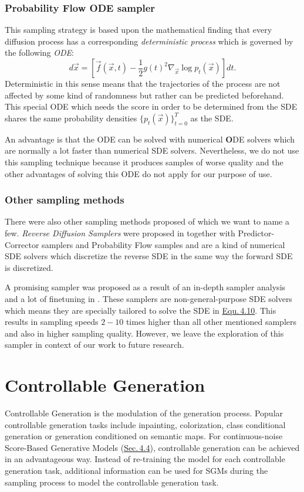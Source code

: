 \subsubsection{Probability Flow ODE sampler}
%
This sampling strategy is based upon the mathematical finding that every diffusion process has a corresponding \textit{deterministic process} which is governed by the following \textit{ODE}:
%
\begin{equation} \label{equ:4.21}
    d\vec{x}=\left[\vec{f}(\vec{x},t)-\frac{1}{2}g(t)^2\nabla_{\vec{x}}\log p_t(\vec{x})\right]dt.
\end{equation}
%
Deterministic in this sense means that the trajectories of the process are not affected by some kind of randomness but rather can be predicted beforehand. This special ODE which needs the score in order to be determined from the SDE shares the same probability densities $\{p_t(\vec{x})\}_{t=0}^T$ as the SDE. 

An advantage is that the ODE can be solved with numerical \textbf{O}DE solvers which are normally a lot faster than numerical SDE solvers. Nevertheless, we do not use this sampling technique because it produces samples of worse quality \cite{score_3} and the other advantages of solving this ODE do not apply for our purpose of use.
%
\subsubsection{Other sampling methods}
%
There were also other sampling methods proposed of which we want to name a few. \textit{Reverse Diffusion Samplers} were proposed in \cite{score_3} together with Predictor-Corrector samplers and Probability Flow samples and are a kind of numerical SDE solvers which discretize the reverse SDE in the same way the forward SDE is discretized.

A promising sampler was proposed as a result of an in-depth sampler analysis and a lot of finetuning in \cite{gotta_go_fast}. These samplers are non-general-purpose SDE solvers which means they are specially tailored to solve the SDE in \hyperref[equ:4.10]{Equ.\,4.10}. This results in sampling speeds $2-10$ times higher than all other mentioned samplers and also in higher sampling quality. However, we leave the exploration of this sampler in context of our work to future research.

\section{Controllable Generation} \label{sec:4.5}
Controllable Generation is the modulation of the generation process. Popular controllable generation tasks include inpainting, colorization, class conditional generation or generation conditioned on semantic maps. For continuous-noise Score-Based Generative Models (\hyperref[sec:4.4]{Sec.\,4.4}), controllable generation can be achieved in an advantageous way. Instead of re-training the model for each controllable generation task, additional information can be used for SGMs during the sampling process to model the controllable generation task.

